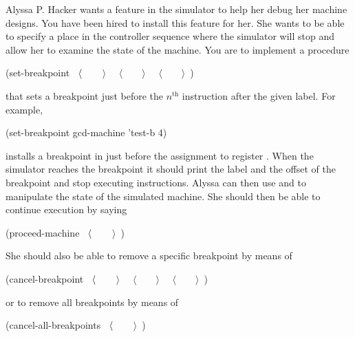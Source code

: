 \begin{exerciseGroup}
\label{Exercise 5.19}
 Alyssa P. Hacker wants a
 feature in the simulator to help her debug her machine
designs.  You have been hired to install this feature for her.  She wants to be
able to specify a place in the controller sequence where the simulator will
stop and allow her to examine the state of the machine.  You are to implement a
procedure

\begin{codeBlock}
(set-breakpoint ~\(\langle\kern0.08em \)~~~~\(\rangle \)~ ~\(\langle \)~~~~\(\rangle \)~ ~\(\langle \)~~~~\(\rangle \)~)
\end{codeBlock}

\noindent
that sets a breakpoint just before the \( n^{\mathrm{th}} \) instruction after the given
label.  For example,

\begin{codeBlock}
(set-breakpoint gcd-machine 'test-b 4)
\end{codeBlock}

\noindent
installs a breakpoint in  just before the assignment to
register .  When the simulator reaches the breakpoint it should print
the label and the offset of the breakpoint and stop executing instructions.
Alyssa can then use  and
 to manipulate the state of the simulated machine.
She should then be able to continue execution by saying

\begin{codeBlock}
(proceed-machine ~\(\langle\kern0.08em \)~~~~\(\rangle \)~)
\end{codeBlock}

She should also be able to remove a specific breakpoint by means of

\begin{codeBlock}
(cancel-breakpoint ~\(\langle\kern0.08em \)~~~~\(\rangle \)~ ~\(\langle \)~~~~\(\rangle \)~ ~\(\langle \)~~~~\(\rangle \)~)
\end{codeBlock}

\noindent
or to remove all breakpoints by means of

\begin{codeBlock}
(cancel-all-breakpoints ~\(\langle\kern0.08em \)~~~~\(\rangle \)~)
\end{codeBlock}
\end{exerciseGroup}

